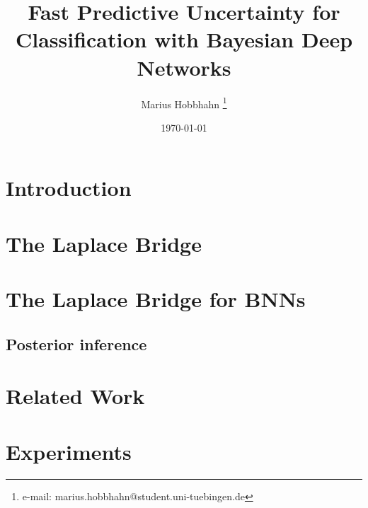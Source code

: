 \documentclass[a4paper,cleardoubleempty,BCOR1cm]{scrbook}
\title{Fast Predictive Uncertainty for Classification with Bayesian Deep Networks}
\author{Marius Hobbhahn \thanks{e-mail: marius.hobbhahn@student.uni-tuebingen.de}}
\date{\today}
\begin{document}
\newpage	


\onehalfspacing %

\pagestyle{fancy}
\fancyhf{}
\fancyfoot[LE,RO]{\thepage}  %




\tableofcontents

\pagestyle{fancy}
\fancyhf{}
\fancyhead[LE,RO]{\leftmark}   %
\fancyhead[RE,LO]{\thechapter}
\fancyfoot[CE,CO]{\rightmark}  %
\fancyfoot[LE,RO]{\thepage}  %

\chapter{Introduction}
\label{chap:introduction}


\chapter{The Laplace Bridge}
\label{chap:background}


\chapter{The Laplace Bridge for BNNs}
\label{chap:method}


\vspace{0.5em}
\section{Posterior inference}
\label{sec:practicalities}


\chapter{Related Work}
\label{chap:related_work}


\chapter{Experiments}
\label{chap:experiments}

\end{document}
